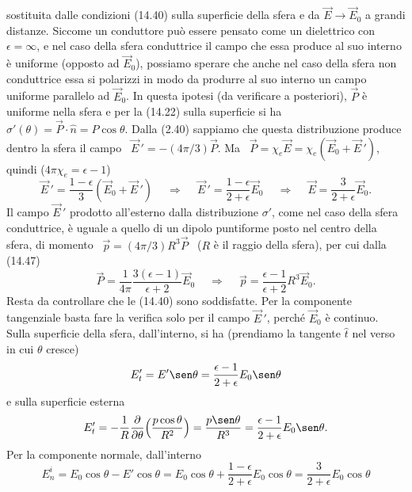 \begin{enumerate}
    sostituita dalle condizioni (14.40) sulla superficie della sfera e da
    $\vec E\to\vec E_0$ a grandi distanze. Siccome un conduttore pu\`o essere
    pensato come un dielettrico con $\epsilon=\infty$, e nel caso della sfera
    conduttrice il campo che essa produce al suo interno \`e uniforme (opposto
    ad $\vec E_0$), possiamo sperare che anche nel caso della sfera non
    conduttrice essa si polarizzi in modo da produrre al suo interno un campo
    uniforme parallelo ad $\vec E_0$. In questa ipotesi (da verificare a
    posteriori), $\vec P$ \`e uniforme nella sfera e per la (14.22) sulla
    superficie si ha \ $\sigma'(\theta)=\vec P\cdot\hat n=P\cos\theta$. Dalla
    (2.40) sappiamo che questa distribuzione produce dentro la sfera il campo
    \ $\vec E\,'=-(4\pi/3)\vec P$. Ma
    \ $\vec P=\chi_e\vec E=\chi_e(\vec E_0+\vec E\,')$, quindi
    ($4\pi\chi_e=\epsilon-1$)
    \begin{equation}
      \vec E\,'=\frac{1-\epsilon}{3}(\vec E_0+\vec E\,')
      \quad\ \Rightarrow\quad\ \vec E\,'=\frac{1-\epsilon}{2+\epsilon}\vec E_0
      \quad\ \Rightarrow\quad\ \vec E=\frac{3}{2+\epsilon}\vec E_0.
      \tag{14.47}
    \end{equation}
    Il campo $\vec E\,'$ prodotto all'esterno dalla distribuzione $\sigma'$,
    come nel caso della sfera conduttrice, \`e uguale a quello di un dipolo
    puntiforme posto nel centro della sfera, di momento
    \ $\vec p=(4\pi/3)R^3\vec P$ \ ($R$ \`e il raggio della sfera), per cui
    dalla (14.47)
    \begin{equation}
      \vec P=\frac{1}{4\pi}\frac{3(\epsilon-1)}{\epsilon+2}\vec E_0
      \quad\ \Rightarrow\quad\ \vec p=\frac{\epsilon-1}{\epsilon+2}R^3\vec E_0.
      \tag{14.48}
    \end{equation}
    Resta da controllare che le (14.40) sono soddisfatte. Per la componente
    tangenziale basta fare la verifica solo per il campo $\vec E\,'$, perch\'e
    $\vec E_0$ \`e continuo. Sulla superficie della sfera, dall'interno, si ha
    (prendiamo la tangente $\hat t$ nel verso in cui $\theta$ cresce)
    \[
      E_t'=E'\sen\theta=\frac{\epsilon-1}{2+\epsilon}E_0\sen\theta
    \]
    e sulla superficie esterna
    \[
      E_t'=-\frac{1}{R}\frac{\partial}{\partial\theta}
      \Big(\frac{p\cos\theta}{R^2}\Big)
      =\frac{p\sen\theta}{R^3}=\frac{\epsilon-1}{2+\epsilon}E_0\sen\theta.
    \]
    Per la componente normale, dall'interno
    \[
      E_n^i=E_0\cos\theta-E'\cos\theta
      =E_0\cos\theta+\frac{1-\epsilon}{2+\epsilon}E_0\cos\theta
      =\frac{3}{2+\epsilon}E_0\cos\theta
\]
\end{enumerate}
